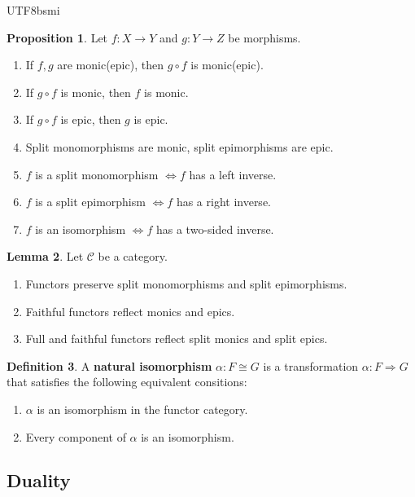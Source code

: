 \documentclass[12pt]{article}
\theoremstyle{definition}
\newtheorem{definition}{Definition}[section]
\newtheorem{property}[definition]{Proposition}
\newtheorem{lemma}[definition]{Lemma}
\newcommand\<{\langle}
\renewcommand\>{\rangle}
\begin{document}
\begin{CJK}{UTF8}{bsmi}
\begin{property}
    Let $f:X\to Y$ and $g:Y\to Z$ be morphisms.
    \begin{enumerate}
        \item If $f, g$ are monic(epic), then $g\circ f$ is monic(epic).
        \item If $g\circ f$ is monic, then $f$ is monic.
        \item If $g\circ f$ is epic, then $g$ is epic.
        \item Split monomorphisms are monic, split epimorphisms are epic.
        \item $f$ is a split monomorphism $\iff f$ has a left inverse.
        \item $f$ is a split epimorphism $\iff f$ has a right inverse.
        \item $f$ is an isomorphism $\iff f$ has a two-sided inverse.
    \end{enumerate}
\end{property}

\begin{lemma}
\label{FF functor}
    Let $\mathcal{C}$ be a category.
    \begin{enumerate}
        \item Functors preserve split monomorphisms and split epimorphisms.
        \item Faithful functors reflect monics and epics.
        \item Full and faithful functors reflect split monics and split epics.
    \end{enumerate}
\end{lemma}

\begin{definition}
    A \textbf{natural isomorphism} $\alpha:F\cong G$ is a transformation $\alpha:F\Rightarrow G$ that satisfies the following equivalent consitions:
    \begin{enumerate}
        \item $\alpha$ is an isomorphism in the functor category.
        \item Every component of $\alpha$ is an isomorphism.
    \end{enumerate}
\end{definition}

\subsection{Duality}


\end{CJK}
\end{document}
